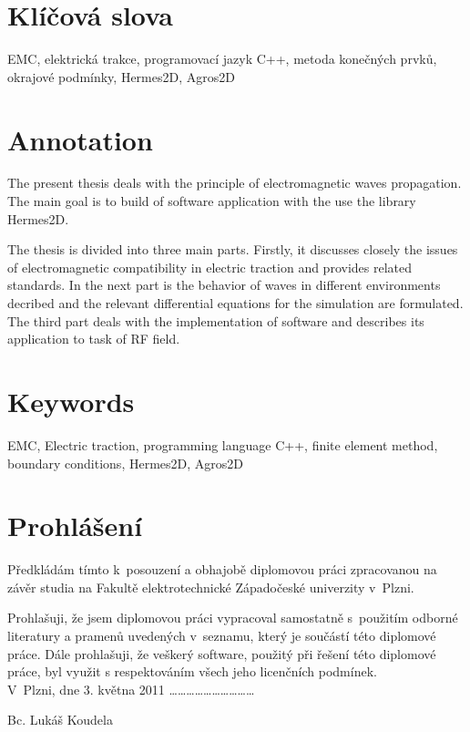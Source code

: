\section*{Klíčová slova}
EMC, elektrická trakce, programovací jazyk C++, metoda konečných prvků, okrajové podmínky, Hermes2D, Agros2D

\bigskip

\section*{Annotation}
The present thesis deals with the principle of electromagnetic waves propagation. The main goal is to build of software application with the use the library Hermes2D.

The thesis is divided into three main parts. Firstly, it discusses closely the issues of electromagnetic compatibility in electric traction and provides related standards.
In the next part is the behavior of waves in different environments decribed and the relevant differential equations for the simulation are formulated. The third part deals with the implementation of software and describes its application to task of RF field.

\section*{Keywords}
EMC, Electric traction, programming language C++, finite element method, boundary conditions, Hermes2D, Agros2D
\newpage

\section*{Prohlášení}
Předkládám tímto k~posouzení a obhajobě diplomovou práci zpracovanou na závěr studia na Fakultě elektrotechnické Západočeské univerzity v~Plzni.

Prohlašuji, že jsem diplomovou práci vypracoval samostatně s~použitím odborné literatury a pramenů uvedených v~seznamu, který je součástí této diplomové práce.
Dále prohlašuji, že veškerý software, použitý při řešení této diplomové práce, byl využit s respektováním všech jeho licenčních podmínek.\bigskip \bigskip \\

\noindent V~Plzni, dne 3. května 2011 \hfill \ldots \ldots \ldots \ldots \ldots \ldots \ldots \ldots \ldots \ldots
\noindent \begin{flushright}Bc. Lukáš Koudela ~~~~~~~\end{flushright}
\newpage

